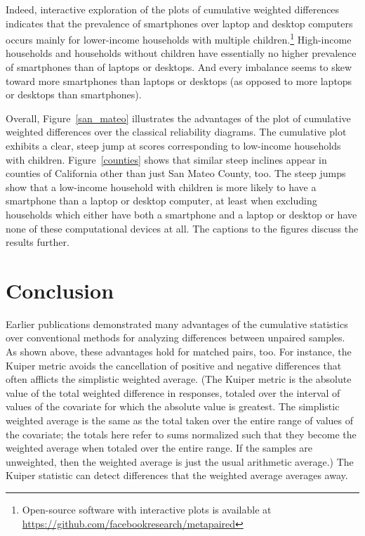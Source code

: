 \documentclass[]{fairmeta}
\begin{document}
Indeed, interactive exploration of the plots of cumulative weighted differences
indicates that the prevalence of smartphones over laptop and desktop computers
occurs mainly for lower-income households
with multiple children.\footnote{Open-source software with interactive plots
is available at \url{https://github.com/facebookresearch/metapaired}}
High-income households and households without children have essentially no
higher prevalence of smartphones than of laptops or desktops.
And every imbalance seems to skew toward more smartphones than laptops
or desktops (as opposed to more laptops or desktops than smartphones).

Overall, Figure~\ref{san_mateo} illustrates the advantages of the plot
of cumulative weighted differences over the classical reliability diagrams.
The cumulative plot exhibits a clear, steep jump at scores
corresponding to low-income households with children.
Figure~\ref{counties} shows that similar steep inclines appear
in counties of California other than just San Mateo County, too.
The steep jumps show that a low-income household with children
is more likely to have a smartphone than a laptop or desktop computer,
at least when excluding households which either have both a smartphone
and a laptop or desktop or have none of these computational devices at all.
The captions to the figures discuss the results further.



\section{Conclusion}
\label{conclusion}

Earlier publications demonstrated many advantages of the cumulative statistics
over conventional methods for analyzing differences between unpaired samples.
As shown above, these advantages hold for matched pairs, too.
For instance, the Kuiper metric avoids the cancellation
of positive and negative differences that often afflicts
the simplistic weighted average.
(The Kuiper metric is the absolute value of the total weighted difference
in responses, totaled over the interval of values of the covariate
for which the absolute value is greatest. The simplistic weighted average is
the same as the total taken over the entire range of values of the covariate;
the totals here refer to sums normalized such that they become
the weighted average when totaled over the entire range.
If the samples are unweighted, then the weighted average is just the usual
arithmetic average.) The Kuiper statistic can detect differences
that the weighted average averages away.
\end{document}
